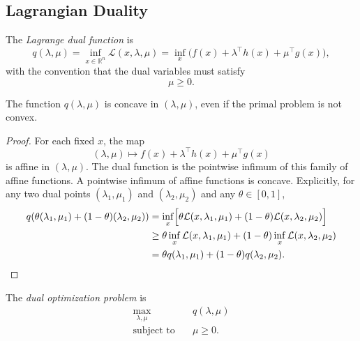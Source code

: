 \subsection{Lagrangian Duality}
\label{sec:l3-lagrangian-duality}

\begin{definition}\label{def:l3-dual-function}
	The \emph{Lagrange dual function} is
	\[
		q(\lambda,\mu)
		=
		\inf_{x \in \mathbb{R}^n} \mathcal{L}(x,\lambda,\mu)
		=
		\inf_x \bigl(f(x)+\lambda^\top h(x)+\mu^\top g(x)\bigr),
	\]
	with the convention that the dual variables must satisfy
	\[
		\mu \ge 0.
	\]
\end{definition}

\begin{proposition}\label{prop:l3-the-dual-function-is-concave}
	The function $q(\lambda,\mu)$ is concave in $(\lambda,\mu)$, even if the primal problem is not convex.
\end{proposition}
\begin{proof}
	For each fixed $x$, the map
	\[
		(\lambda,\mu)\mapsto f(x)+\lambda^\top h(x)+\mu^\top g(x)
	\]
	is affine in $(\lambda,\mu)$. The dual function is the pointwise infimum of this family of affine functions. A pointwise infimum of affine functions is concave. Explicitly, for any two dual points $(\lambda_1,\mu_1)$ and $(\lambda_2,\mu_2)$ and any $\theta \in [0,1]$,
	\begin{align*}
		q(\theta(\lambda_1,\mu_1)+(1-\theta)(\lambda_2,\mu_2))
		 & = \inf_x \Bigl[\theta \mathcal{L}(x,\lambda_1,\mu_1)+(1-\theta)\mathcal{L}(x,\lambda_2,\mu_2)\Bigr] \\
		 & \ge \theta \inf_x \mathcal{L}(x,\lambda_1,\mu_1)+(1-\theta)\inf_x \mathcal{L}(x,\lambda_2,\mu_2) \\
		 & = \theta q(\lambda_1,\mu_1)+(1-\theta)q(\lambda_2,\mu_2).
	\end{align*}
\end{proof}

\begin{definition}\label{def:l3-dual-problem}
	The \emph{dual optimization problem} is
	\begin{align*}
		\max_{\lambda,\mu}\quad & q(\lambda,\mu) \\
		\text{subject to}\quad & \mu \ge 0.
	\end{align*}
\end{definition}

